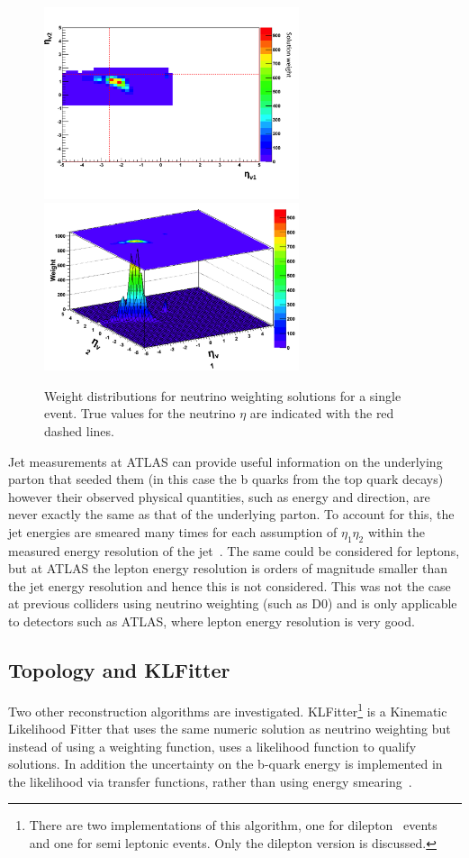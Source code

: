\begin{figure}[htbp!]
	\begin{center}
	\includegraphics[width=75mm]{f/top_nuweights_1d_2}
	\includegraphics[width=75mm]{f/top_nuweights_2d_2}
	\end{center}
	\caption{Weight distributions for neutrino weighting solutions for a single event. True values for the neutrino $\eta$ are indicated with the red dashed lines.}
	\label{fig:top_nuweights}
\end{figure}

Jet measurements at ATLAS can provide useful information on the underlying parton that seeded them (in this case the b quarks from the top quark decays) however their observed physical quantities, such as energy and direction, are never exactly the same as that of the underlying parton. To account for this, the jet energies are smeared many times for each assumption of $\eta_1\eta_2$ within the measured energy resolution of the jet~\cite{jetres}. The same could be considered for leptons, but at ATLAS the lepton energy resolution is orders of magnitude smaller than the jet energy resolution and hence this is not considered. This was not the case at previous colliders using neutrino weighting (such as D0) and is only applicable to detectors such as ATLAS, where lepton energy resolution is very good.

\subsection{Topology and KLFitter}
Two other reconstruction algorithms are investigated. KLFitter\footnote{There are two implementations of this algorithm, one for dilepton \ttbar\ events and one for semi leptonic \ttbar events. Only the dilepton version is discussed.} is a Kinematic Likelihood Fitter that uses the same numeric solution as neutrino weighting but instead of using a weighting function, uses a likelihood function to qualify solutions. In addition the uncertainty on the b-quark energy is implemented in the likelihood via transfer functions, rather than using energy smearing~\cite{klfitter}.

